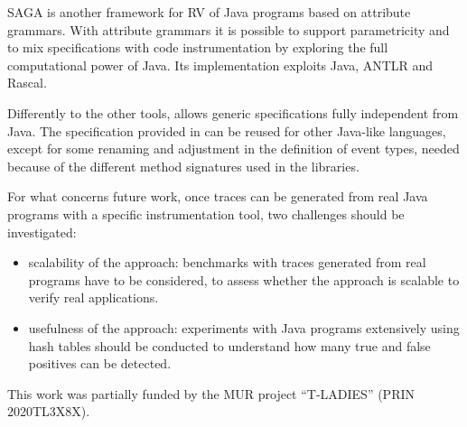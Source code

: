 SAGA  \cite{BoerGouw14} is another framework for RV of Java programs
based on attribute grammars. With attribute grammars it is possible to support parametricity and to mix specifications
with code instrumentation by exploring the full computational power of Java. Its implementation exploits Java, ANTLR and Rascal.

Differently to the other tools, \rml allows generic specifications fully independent from Java.
The specification provided in  can be reused for other Java-like languages, except for some renaming and adjustment
in the definition of event types, needed because of the different method signatures used in the libraries.

For what concerns future work, once traces can be generated from real Java programs with a specific instrumentation tool,
two challenges should be investigated:
\begin{itemize}
\item scalability of the approach: benchmarks with traces generated from real programs have to be considered, to assess whether
  the approach is scalable to verify real applications.
\item usefulness of the approach: experiments with Java programs extensively using hash tables should be conducted to understand
  how many true and false positives can be detected.
\end{itemize}




\begin{acks}
This work was partially funded by the MUR project ``T-LADIES'' (PRIN 2020TL3X8X).
\end{acks}

